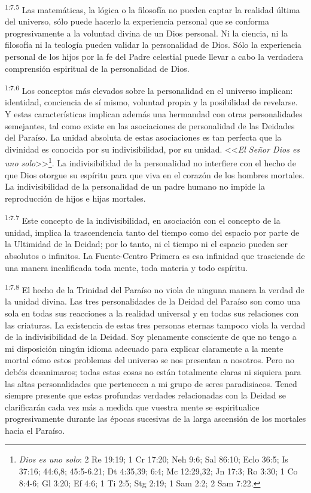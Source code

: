 \par
\textsuperscript{1:7.5} Las matemáticas, la lógica o la filosofía no pueden captar la realidad última del universo, sólo puede hacerlo la experiencia personal que se conforma progresivamente a la voluntad divina de un Dios personal. Ni la ciencia, ni la filosofía ni la teología pueden validar la personalidad de Dios. Sólo la experiencia personal de los hijos por la fe del Padre celestial puede llevar a cabo la verdadera comprensión espiritual de la personalidad de Dios.

\par
\textsuperscript{1:7.6} Los conceptos más elevados sobre la personalidad en el universo implican: identidad, conciencia de sí mismo, voluntad propia y la posibilidad de revelarse. Y estas características implican además una hermandad con otras personalidades semejantes, tal como existe en las asociaciones de personalidad de las Deidades del Paraíso. La unidad absoluta de estas asociaciones es tan perfecta que la divinidad es conocida por su indivisibilidad, por su unidad. <<\textit{El Señor Dios es uno solo}>>\footnote{\textit{Dios es uno solo}: 2 Re 19:19; 1 Cr 17:20; Neh 9:6; Sal 86:10; Eclo 36:5; Is 37:16; 44:6,8; 45:5-6.21; Dt 4:35,39; 6:4; Mc 12:29,32; Jn 17:3; Ro 3:30; 1 Co 8:4-6; Gl 3:20; Ef 4:6; 1 Ti 2:5; Stg 2:19; 1 Sam 2:2; 2 Sam 7:22.}. La indivisibilidad de la personalidad no interfiere con el hecho de que Dios otorgue su espíritu para que viva en el corazón de los hombres mortales. La indivisibilidad de la personalidad de un padre humano no impide la reproducción de hijos e hijas mortales.

\par
\textsuperscript{1:7.7} Este concepto de la indivisibilidad, en asociación con el concepto de la unidad, implica la trascendencia tanto del tiempo como del espacio por parte de la Ultimidad de la Deidad; por lo tanto, ni el tiempo ni el espacio pueden ser absolutos o infinitos. La Fuente-Centro Primera es esa infinidad que trasciende de una manera incalificada toda mente, toda materia y todo espíritu.

\par
\textsuperscript{1:7.8} El hecho de la Trinidad del Paraíso no viola de ninguna manera la verdad de la unidad divina. Las tres personalidades de la Deidad del Paraíso son como una sola en todas sus reacciones a la realidad universal y en todas sus relaciones con las criaturas. La existencia de estas tres personas eternas tampoco viola la verdad de la indivisibilidad de la Deidad. Soy plenamente consciente de que no tengo a mi disposición ningún idioma adecuado para explicar claramente a la mente mortal cómo estos problemas del universo se nos presentan a nosotros. Pero no debéis desanimaros; todas estas cosas no están totalmente claras ni siquiera para las altas personalidades que pertenecen a mi grupo de seres paradisiacos. Tened siempre presente que estas profundas verdades relacionadas con la Deidad se clarificarán cada vez más a medida que vuestra mente se espiritualice progresivamente durante las épocas sucesivas de la larga ascensión de los mortales hacia el Paraíso.

